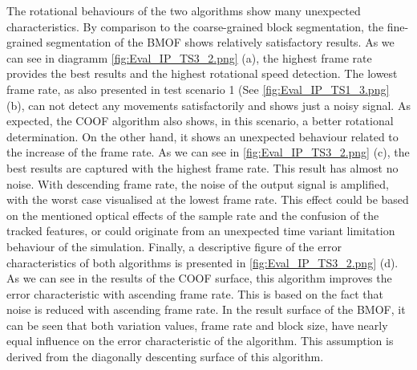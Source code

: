 The rotational behaviours of the two algorithms show many unexpected characteristics. By comparison to the coarse-grained block segmentation, the fine-grained segmentation of the \gls{BMOF} shows relatively satisfactory results. As we can see in diagramm \ref{fig:Eval_IP_TS3_2.png} (a), the highest frame rate provides the best results and the highest rotational speed detection. The lowest frame rate, as also presented in test scenario 1 (See \ref{fig:Eval_IP_TS1_3.png} (b), can not detect any movements satisfactorily and shows just a noisy signal. As expected, the \gls{COOF} algorithm also shows, in this scenario, a better rotational determination. On the other hand, it shows an unexpected behaviour related to the increase of the frame rate. As we can see in \ref{fig:Eval_IP_TS3_2.png} (c), the best results are captured with the highest frame rate. This result has almost no noise. With descending frame rate, the noise of the output signal is amplified, with the worst case visualised at the lowest frame rate. This effect could be based on the mentioned optical effects of the sample rate and the confusion of the tracked features, or could originate from an unexpected time variant limitation behaviour of the simulation.
Finally, a descriptive figure of the error characteristics of both algorithms is presented in \ref{fig:Eval_IP_TS3_2.png} (d). As we can see in the results of the \gls{COOF} surface, this algorithm improves the error characteristic with ascending frame rate. This is based on the fact that noise is reduced with ascending frame rate. In the result surface of the \gls{BMOF}, it can be seen that both variation values, frame rate and block size, have nearly equal influence on the error characteristic of the algorithm. This assumption is derived from the diagonally descenting surface of this algorithm.
 

